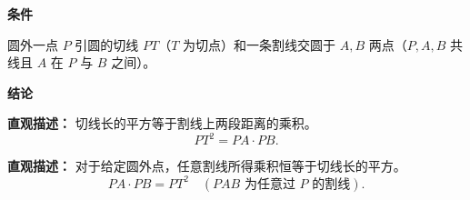 \begin{statementbox}
	\textbf{\textcolor{CStatement}{条件}}
	\begin{description}[style=nextline, leftmargin=2.8em, labelsep=0.5em, itemsep=0.35em]
		\item[\textbf{\textcolor{CStatement}{条件 1（圆外一点与切线、割线）：}}]
			圆外一点 $P$ 引圆的切线 $PT$（$T$ 为切点）和一条割线交圆于 $A,B$ 两点（$P,A,B$ 共线且 $A$ 在 $P$ 与 $B$ 之间）。
	\end{description}
	\textbf{\textcolor{CStatement}{结论}}
	\begin{description}[style=nextline, leftmargin=2.8em, labelsep=0.5em, itemsep=0.45em]
		\item[\textbf{\textcolor{CStatement}{结论一（切割线等积）：}}]
			\textbf{\textcolor{CStatement}{直观描述：}}
			切线长的平方等于割线上两段距离的乘积。
			\[
				PT^{2}=PA\cdot PB .
			\]
		\item[\textbf{\textcolor{CStatement}{推广结论（积为定值）：}}]
			\textbf{\textcolor{CStatement}{直观描述：}}
			对于给定圆外点，任意割线所得乘积恒等于切线长的平方。
			\[
				PA\cdot PB = PT^{2} \quad (\text{$PAB$ 为任意过 $P$ 的割线}).
			\]
	\end{description}

\end{statementbox}
